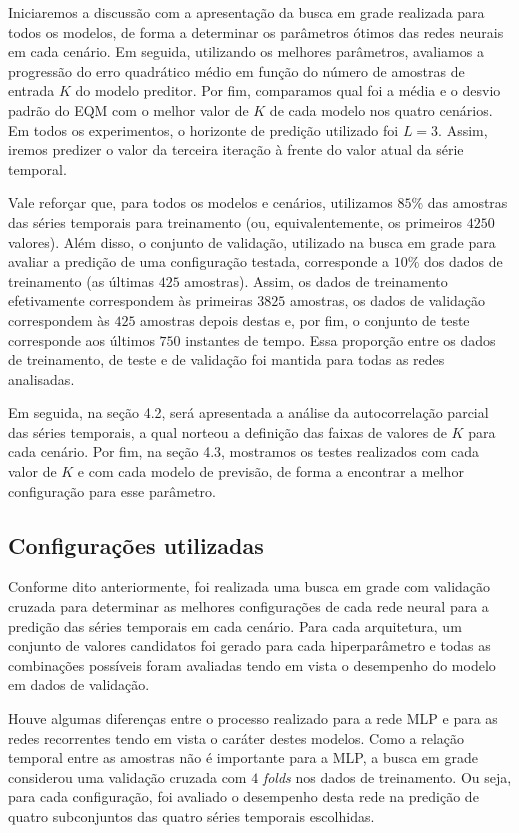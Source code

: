 \documentclass[a4paper, 12pt]{article}
\begin{document}
Iniciaremos a discussão com a apresentação da busca em grade realizada para  todos os modelos, de forma a determinar os parâmetros ótimos das redes neurais em cada cenário. Em seguida, utilizando os melhores parâmetros, avaliamos a progressão do erro quadrático médio em função do número de amostras de entrada $K$ do modelo preditor. Por fim, comparamos qual foi a média e o desvio padrão do EQM com o melhor valor de $K$ de cada modelo nos quatro cenários. Em todos os experimentos, o horizonte de predição utilizado foi $L=3$. Assim, iremos predizer o valor da terceira iteração à frente do valor atual da série temporal.

Vale reforçar que, para todos os modelos e cenários, utilizamos $85\%$ das amostras das séries temporais para treinamento (ou, equivalentemente, os primeiros $4250$ valores).  Além disso, o conjunto de validação, utilizado na busca em grade para avaliar a predição de uma configuração testada, corresponde a $10\%$ dos dados de treinamento (as últimas $425$ amostras). Assim, os dados de treinamento efetivamente correspondem às primeiras $3825$ amostras, os dados de validação correspondem às $425$ amostras depois destas e, por fim, o conjunto de teste corresponde aos últimos $750$ instantes de tempo. Essa proporção entre os dados de treinamento, de teste e de validação foi mantida para todas as redes analisadas.

Em seguida, na seção 4.2, será apresentada a análise da autocorrelação parcial das séries temporais, a qual norteou a definição das faixas de valores de $K$ para cada cenário. Por fim, na seção 4.3, mostramos os testes realizados com cada valor de $K$ e com cada modelo de previsão, de forma a encontrar a melhor configuração para esse parâmetro. 

\subsection{Configurações utilizadas}

Conforme dito anteriormente, foi realizada uma busca em grade com validação cruzada para determinar as melhores configurações de cada rede neural para a predição das séries temporais em cada cenário. Para cada arquitetura, um conjunto de valores candidatos foi gerado para cada hiperparâmetro e todas as combinações possíveis foram avaliadas tendo em vista o desempenho do modelo em dados de validação.

Houve algumas diferenças entre o processo realizado para a rede MLP e para as redes recorrentes tendo em vista o caráter destes modelos. Como a relação temporal entre as amostras não é importante para a MLP, a busca em grade considerou uma validação cruzada com $4$ \textit{folds} nos dados de treinamento. Ou seja, para cada configuração, foi avaliado o desempenho desta rede na predição de quatro subconjuntos das quatro séries temporais escolhidas.
\end{document}
